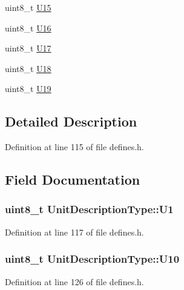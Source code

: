 \begin{DoxyCompactItemize}
\item 
uint8\-\_\-t \hyperlink{structUnitDescriptionType_a67851c4a906293451b0c3e49fe79329c}{U15}
\item 
uint8\-\_\-t \hyperlink{structUnitDescriptionType_a7ff11ef3bf5d3e485d300dc46bfc06d7}{U16}
\item 
uint8\-\_\-t \hyperlink{structUnitDescriptionType_a21f0e4e804978c6b29699ae3ed0e5060}{U17}
\item 
uint8\-\_\-t \hyperlink{structUnitDescriptionType_a5af9c5dc8c43c0c53b847bb0e25d8c18}{U18}
\item 
uint8\-\_\-t \hyperlink{structUnitDescriptionType_aeb14175b8f3acc759a3a3c0148a38123}{U19}
\end{DoxyCompactItemize}


\subsection{Detailed Description}


Definition at line 115 of file defines.\-h.



\subsection{Field Documentation}
\hypertarget{structUnitDescriptionType_a3752aa69edf4c75a4d7a00cead8074a4}{
\subsubsection[{U1}]{\setlength{\rightskip}{0pt plus 5cm}uint8\-\_\-t Unit\-Description\-Type\-::\-U1}}\label{structUnitDescriptionType_a3752aa69edf4c75a4d7a00cead8074a4}


Definition at line 117 of file defines.\-h.

\hypertarget{structUnitDescriptionType_a2751eba36a1207fbeed39f8c1b99dd17}{
\subsubsection[{U10}]{\setlength{\rightskip}{0pt plus 5cm}uint8\-\_\-t Unit\-Description\-Type\-::\-U10}}\label{structUnitDescriptionType_a2751eba36a1207fbeed39f8c1b99dd17}


Definition at line 126 of file defines.\-h.

